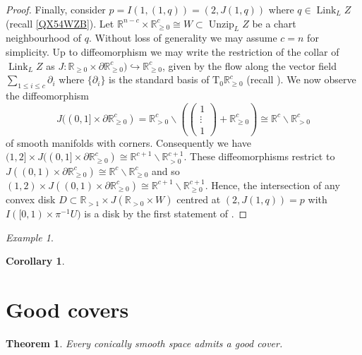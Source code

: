\documentclass[11pt]{amsart}
\newcommand{\mbb}[1]{\mathbb{#1}}
\newcommand{\R}{\mbb{R}}
\newcommand{\Tangent}{\mathrm{T}}
\DeclareMathOperator{\Unzip}{Unzip}
\DeclareMathOperator{\Link}{Link}
\numberwithin{equation}{section}
\theoremstyle{definition}
\theoremstyle{remark}
\newtheorem{example}[equation]{Example}
\theoremstyle{plain}
\newtheorem{theorem}[equation]{Theorem}
\newtheorem{corollary}[equation]{Corollary}
\begin{document}
\begin{proof}
    Finally, consider $p=I(1,(1,q))=(2,J(1,q))$ where $q\in\Link_LZ$ (recall \eqref{QX54WZB}). Let $\R^{n-c}\times\R^{c}_{\geq0}\cong W\subset\Unzip_LZ$ be a chart neighbourhood of $q$. Without loss of generality we may assume $c=n$ for simplicity. Up to diffeomorphism we may write the restriction of the collar of $\Link_LZ$ as $J\colon\R_{\geq0}\times\partial\R^c_{\geq0})\hookrightarrow \R^c_{\geq0}$, given by the flow along the vector field $\sum_{1\leq i\leq c}\partial_i$ where $\{\partial_i\}$ is the standard basis of $\Tangent_0\R^c_{\geq0}$ (recall ). We now observe the diffeomorphism 
    \[
        J((0,1]\times\partial \R^{c}_{\geq0})=\R^c_{>0}\smallsetminus\left(\begin{pmatrix}
        1 \\ \vdots \\ 1
        \end{pmatrix}
        +\R^c_{\geq0}\right)
        \cong\R^c\smallsetminus\R^c_{>0}
    \]
    of smooth manifolds with corners.
    Consequently we have $(1,2]\times J((0,1]\times\partial\R^c_{\geq0})\cong\R^{c+1}\smallsetminus\R^{c+1}_{>0}$. These diffeomorphisms restrict to $J((0,1)\times \partial\R^c_{\geq0})\cong\R^c\smallsetminus\R^c_{\geq0}$ and so $(1,2)\times J((0,1)\times\partial\R^c_{\geq0})\cong \R^{c+1}\smallsetminus\R^{c+1}_{\geq0}$. Hence, the intersection of any convex disk $D\subset\R_{>1}\times J(\R_{>0}\times W)$ centred at $(2,J(1,q))=p$ with $I([0,1)\times\pi^{-1}U)$ is a disk by the first statement of .
\end{proof}

\begin{example}
    
\end{example}

\begin{corollary}
    
\end{corollary}


\section{Good covers}

\begin{theorem}
    Every conically smooth space admits a good cover.
\end{theorem}
\end{document}
